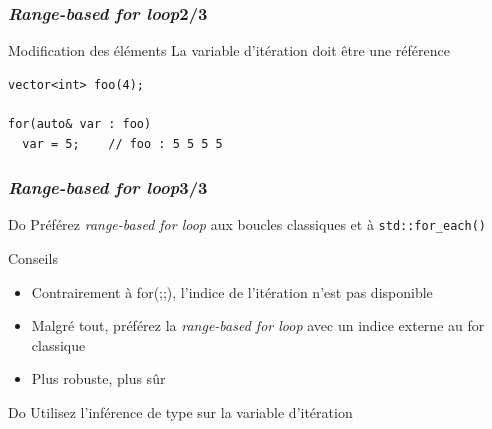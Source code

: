 \documentclass[C++.tex]{subfiles}
\begin{document}
\begin{frame}[fragile]
	\frametitle{\textit{Range-based for loop}\titlehfill{}2/3}
	\begin{alertblock}{Modification des éléments}
		La variable d'itération doit être une référence
	\end{alertblock}

	\begin{lstlisting}
vector<int> foo(4);

for(auto& var : foo)
  var = 5;    // foo : 5 5 5 5\end{lstlisting}
\end{frame}

\begin{frame}
	\frametitle{\textit{Range-based for loop}\titlehfill{}3/3}
	\begin{exampleblock}{Do}
		Préférez \textit{range-based for loop} aux boucles classiques et à \lstinline|std::for_each()|
	\end{exampleblock}

	\begin{block}{Conseils}
		\begin{itemize}
			\item Contrairement à for(;;), l'indice de l'itération n'est pas disponible
			\item Malgré tout, préférez la \textit{range-based for loop} avec un indice externe au for classique
			\item Plus robuste, plus sûr

		\end{itemize}
	\end{block}

	\begin{exampleblock}{Do}
		Utilisez l'inférence de type sur la variable d'itération
	\end{exampleblock}
\end{frame}
\end{document}
